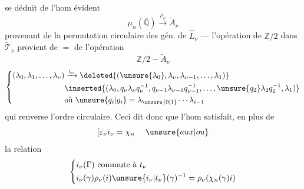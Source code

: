 se déduit de l'hom évident
\[
\mu_n(\overline{\mathbb Q})\xrightarrow{\rho_\nu}\widetilde A_\nu
\]
provenant de la permutation circulaire des
gén. de $\widehat L_\nu$ --- l'opération de
$\mathbb Z/2$ dans $\widetilde{\mathcal T}_\nu$ provient de $=$ de
l'opération
\[
\mathbb Z/2-\widetilde A_\nu
\]
\[
\left\{\begin{aligned}
(\lambda_0,\lambda_1,\ldots,\lambda_\nu)&\xrightarrow{t_\nu}
\deleted{(\unsure{\lambda_0},\lambda_\nu,\lambda_{\nu-1},\ldots,\lambda_1)}\\
&\inserted{(\lambda_0,q_\nu\lambda_\nu q_\nu^{-1},
q_{\nu-1}\lambda_{\nu-1}q_{\nu-1}^{-1},\ldots,
\unsure{q_2}\lambda_2q_2^{-1},\lambda_1)}\\
&\text{où }\unsure{q_i|g_i}=\lambda_{\unsure{0|1}}\cdots\lambda_{i-1}
\end{aligned}\right.
\]
qui renverse l'ordre circulaire.
Ceci dit donc que l'hom
satisfait, en plus de
\[
\left[\varepsilon_\nu i_\nu=\chi_n\right.\quad\unsure{aux|ou}
\]
la relation
\[
\left\{\begin{aligned}
&i_\nu(\Gamma)\text{ commute à }t_\nu\\
&i_\nu(\gamma)\rho_\nu(i)\unsure{i_\nu|t_\nu}(\gamma)^{-1}
=\rho_\nu(\chi_n(\gamma)i)
\end{aligned}\right.
\]
